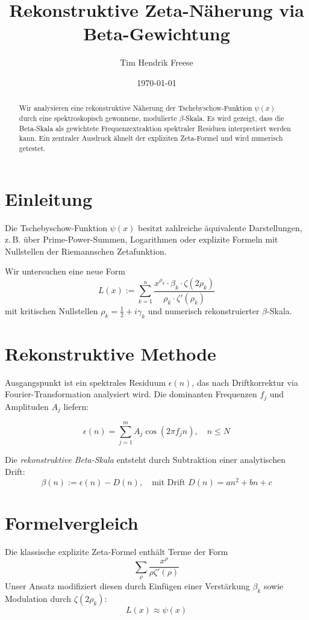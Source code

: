 \documentclass[12pt]{article}
\title{Rekonstruktive Zeta-Näherung via Beta-Gewichtung}
\author{Tim Hendrik Freese}
\date{\today}
\begin{document}
\maketitle

\begin{abstract}
Wir analysieren eine rekonstruktive Näherung der Tschebyschow-Funktion $\psi(x)$ durch eine spektroskopisch gewonnene, modulierte $\beta$-Skala. Es wird gezeigt, dass die Beta-Skala als gewichtete Frequenzextraktion spektraler Residuen interpretiert werden kann. Ein zentraler Ausdruck ähnelt der expliziten Zeta-Formel und wird numerisch getestet.
\end{abstract}

\section{Einleitung}
Die Tschebyschow-Funktion $\psi(x)$ besitzt zahlreiche äquivalente Darstellungen, z.\,B. über Prime-Power-Summen, Logarithmen oder explizite Formeln mit Nullstellen der Riemannschen Zetafunktion.

Wir untersuchen eine neue Form
\begin{equation} \label{eq:main}
L(x) := \sum_{k=1}^{n} \frac{x^{\rho_k} \cdot \beta_k \cdot \zeta(2\rho_k)}{\rho_k \cdot \zeta'(\rho_k)}
\end{equation}
mit kritischen Nullstellen $\rho_k = \tfrac{1}{2} + i\gamma_k$ und numerisch rekonstruierter $\beta$-Skala.

\section{Rekonstruktive Methode}
Ausgangspunkt ist ein spektrales Residuum $\epsilon(n)$, das nach Driftkorrektur via Fourier-Transformation analysiert wird. Die dominanten Frequenzen $f_j$ und Amplituden $A_j$ liefern:

\[
\epsilon(n) = \sum_{j=1}^{m} A_j \cos(2\pi f_j n), \quad n \leq N
\]

Die \emph{rekonstruktive Beta-Skala} entsteht durch Subtraktion einer analytischen Drift:
\[
\beta(n) := \epsilon(n) - D(n), \quad \text{mit Drift } D(n) = an^2 + bn + c
\]

\section{Formelvergleich}
Die klassische explizite Zeta-Formel enthält Terme der Form
\[
\sum_{\rho} \frac{x^\rho}{\rho \zeta'(\rho)}
\]
Unser Ansatz modifiziert diesen durch Einfügen einer Verstärkung $\beta_k$ sowie Modulation durch $\zeta(2\rho_k)$:
\[
L(x) \approx \psi(x)
\]
\end{document}
